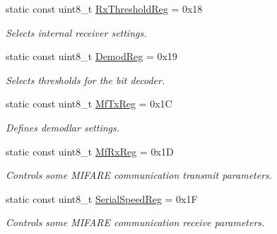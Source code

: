 \begin{DoxyCompactItemize}
\mbox{\label{classMFRC522_a1b2198d0854741c169234c9d2739e504}} 
static const uint8\+\_\+t \hyperlink{classMFRC522_a1b2198d0854741c169234c9d2739e504}{Rx\+Threshold\+Reg} = 0x18
\begin{DoxyCompactList}\small\item\em Selects internal receiver settings. \end{DoxyCompactList}\item 
\mbox{\label{classMFRC522_a572ee6f622da471c04fb82775a3bc0e5}} 
static const uint8\+\_\+t \hyperlink{classMFRC522_a572ee6f622da471c04fb82775a3bc0e5}{Demod\+Reg} = 0x19
\begin{DoxyCompactList}\small\item\em Selects thresholds for the bit decoder. \end{DoxyCompactList}\item 
\mbox{\label{classMFRC522_aa976848be7b3270afec5207783cc2772}} 
static const uint8\+\_\+t \hyperlink{classMFRC522_aa976848be7b3270afec5207783cc2772}{Mf\+Tx\+Reg} = 0x1C
\begin{DoxyCompactList}\small\item\em Defines demodlar settings. \end{DoxyCompactList}\item 
\mbox{\label{classMFRC522_acb62dc819b455ee6a404bdfe191a7132}} 
static const uint8\+\_\+t \hyperlink{classMFRC522_acb62dc819b455ee6a404bdfe191a7132}{Mf\+Rx\+Reg} = 0x1D
\begin{DoxyCompactList}\small\item\em Controls some M\+I\+F\+A\+RE communication transmit parameters. \end{DoxyCompactList}\item 
\mbox{\label{classMFRC522_a277d829630c5c1fc131c71e286fc322a}} 
static const uint8\+\_\+t \hyperlink{classMFRC522_a277d829630c5c1fc131c71e286fc322a}{Serial\+Speed\+Reg} = 0x1F
\begin{DoxyCompactList}\small\item\em Controls some M\+I\+F\+A\+RE communication receive parameters. \end{DoxyCompactList}\item 
\mbox{\label{classMFRC522_ac1d563b996ba0cdf5f94dee272454b4c}} 

\end{DoxyCompactItemize}
